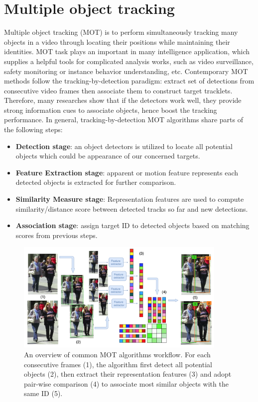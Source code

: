 \section{Multiple object tracking}
\label{sec:mot}
Multiple object tracking (MOT) is to perform simultaneously tracking many objects in a video through locating their positions while maintaining their identities.
MOT task plays an important in many intelligence application, which supplies a helpful tools for complicated analysis works, such as video surveillance, safety monitoring or instance behavior understanding, etc.
Contemporary MOT methods follow the tracking-by-detection paradigm: extract set of detections from consecutive video frames then associate them to construct target tracklets. Therefore, many researches \cite{bergmann2019tracking,zhou2020tracking,bochinski2017high,bewley2016simple} show that if the detectors work well, they provide strong information cues to associate objects, hence boost the tracking performance. 
In general, tracking-by-detection MOT algorithms share parts of the following steps:
\begin{itemize}
    \item \textbf{Detection stage}: an object detectors is utilized to locate all potential objects which could be appearance of our concerned targets.
    \item \textbf{Feature Extraction stage}: apparent or motion feature represents each detected objects is extracted for further comparison.
    \item \textbf{Similarity Measure stage}: Representation features are used to compute similarity/distance score between detected tracks so far and new detections.
    \item \textbf{Association stage}: assign target ID to detected objects based on matching scores from previous steps.
\end{itemize}
\begin{figure}[t!]
    \centering
    \includegraphics[width=0.9\textwidth]{resources/images/MOT_overview.png}
    \caption{An overview of common MOT algorithms workflow. For each consecutive frames (1), the algorithm first detect all potential objects (2), then extract their representation features (3) and adopt pair-wise comparison (4) to associate most similar objects with the same ID (5). \cite{ciaparrone2020deep}}
    \label{fig:MOT_overview}
\end{figure}
